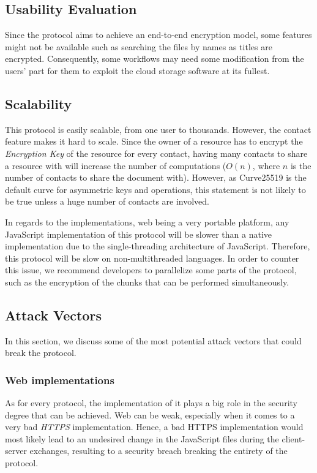 \documentclass[a4paper,9pt,twoside]{article}
\begin{document}
\subsection{Usability Evaluation}

Since the protocol aims to achieve an end-to-end encryption model, some features 
might not be available such as searching the files by names as titles are encrypted. 
Consequently, some workflows may need some modification from the users' part 
for them to exploit the cloud storage software at its fullest.

\subsection{Scalability}

     This protocol is easily scalable, from one user to thousands. However, the contact 
feature makes it hard to scale. Since the owner of a resource has to encrypt the 
\emph{Encryption Key} of the resource for every contact, having many contacts 
to share a resource with will increase the number of computations ($O(n)$, where $n$ 
is the number of contacts to share the document with). However, as Curve25519 is 
the default curve for asymmetric keys and operations, this statement is not likely to be true 
unless a huge number of contacts are involved.

In regards to the implementations, web being a very portable platform, any JavaScript implementation of this protocol 
will be slower than a native implementation due to the single-threading architecture of 
JavaScript. Therefore, this protocol will be slow on non-multithreaded languages. In 
order to counter this issue, we recommend developers to parallelize some parts of the protocol, 
such as the encryption of the chunks that can be performed simultaneously.

\subsection{Attack Vectors}

In this section, we discuss some of the most potential attack vectors that could break 
the protocol.

\subsubsection{Web implementations}

    As for every protocol, the implementation of it plays a big role in the security degree 
that can be achieved. Web can be weak, especially when it comes to a very bad \emph{HTTPS} 
implementation. Hence, a bad HTTPS implementation would most likely lead to an undesired 
change in the JavaScript files during the client-server exchanges, resulting to a security breach 
breaking the entirety of the protocol.
\end{document}
